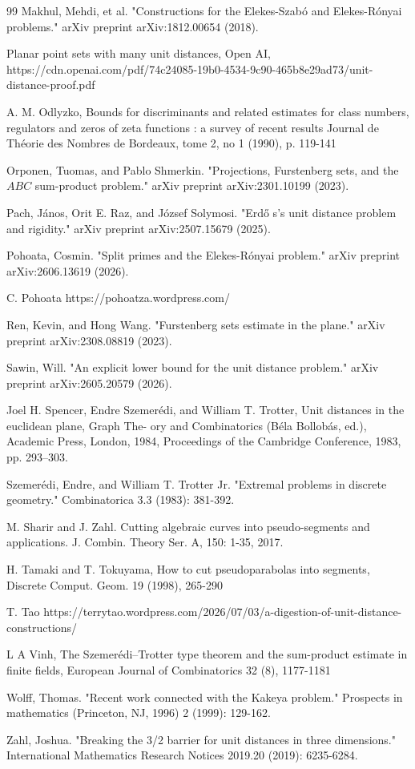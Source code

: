 \documentclass{amsart}
\begin{document}
\begin{thebibliography}{99}
 Makhul, Mehdi, et al. "Constructions for the Elekes-Szab\'o and Elekes-R\'onyai problems." arXiv preprint arXiv:1812.00654 (2018).

 Planar point sets with many unit distances,  Open AI, https://cdn.openai.com/pdf/74c24085-19b0-4534-9c90-465b8e29ad73/unit-distance-proof.pdf

 A. M. Odlyzko,  Bounds for discriminants and related estimates
for class numbers, regulators and zeros of zeta
functions : a survey of recent results
Journal de Théorie des Nombres de Bordeaux, tome 2, no 1 (1990),
p. 119-141

 Orponen, Tuomas, and Pablo Shmerkin. "Projections, Furstenberg sets, and the $ ABC $ sum-product problem." arXiv preprint arXiv:2301.10199 (2023).

 Pach, János, Orit E. Raz, and József Solymosi. "Erd\H {o} s's unit distance problem and rigidity." arXiv preprint arXiv:2507.15679 (2025).

 Pohoata, Cosmin. "Split primes and the Elekes-R\'onyai problem." arXiv preprint arXiv:2606.13619 (2026).

 C. Pohoata https://pohoatza.wordpress.com/

 Ren, Kevin, and Hong Wang. "Furstenberg sets estimate in the plane." arXiv preprint arXiv:2308.08819 (2023).

 Sawin, Will. "An explicit lower bound for the unit distance problem." arXiv preprint arXiv:2605.20579 (2026).

Joel H. Spencer, Endre Szemerédi, and William T. Trotter, Unit distances in the euclidean plane, Graph The-
ory and Combinatorics (Béla Bollobás, ed.), Academic Press, London, 1984, Proceedings of the Cambridge
Conference, 1983, pp. 293–303.

 Szemerédi, Endre, and William T. Trotter Jr. "Extremal problems in discrete geometry." Combinatorica 3.3 (1983): 381-392.

 M. Sharir and J. Zahl. Cutting algebraic curves into pseudo-segments and applications.
J. Combin. Theory Ser. A, 150: 1-35, 2017.

 H. Tamaki and T. Tokuyama,  How to cut pseudoparabolas into segments, Discrete
Comput. Geom. 19 (1998), 265-290

 T. Tao https://terrytao.wordpress.com/2026/07/03/a-digestion-of-unit-distance-constructions/

  L A  Vinh, The Szemerédi–Trotter type theorem and the sum-product estimate in finite fields, 
European Journal of Combinatorics 32 (8), 1177-1181

 Wolff, Thomas. "Recent work connected with the Kakeya problem." Prospects in mathematics (Princeton, NJ, 1996) 2 (1999): 129-162.

 Zahl, Joshua. "Breaking the 3/2 barrier for unit distances in three dimensions." International Mathematics Research Notices 2019.20 (2019): 6235-6284.

\end{thebibliography}
\end{document}
